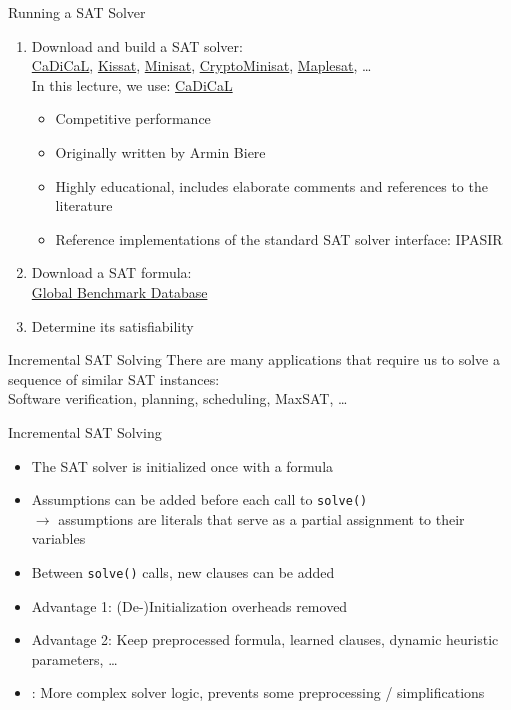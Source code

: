 \documentclass[t]{sdqbeamer}
\begin{document}
\begin{frame}{Running a SAT Solver}
\\[1em]
\begin{enumerate}\setlength{\itemsep}{1em}
	\item Download and build a SAT solver:\\[1ex]
	\href{https://github.com/arminbiere/cadical}{CaDiCaL}, \href{https://github.com/arminbiere/kissat}{Kissat}, \href{https://github.com/niklasso/minisat}{Minisat}, \href{https://github.com/msoos/cryptominisat}{CryptoMinisat}, \href{https://maplesat.github.io/}{Maplesat}, \dots\\[1ex]
	In this lecture, we use: \href{https://github.com/arminbiere/cadical}{CaDiCaL}\\[1ex]
	\begin{itemize}\setlength{\itemsep}{1ex}
		\item Competitive performance
		\item Originally written by Armin Biere
		\item Highly educational, includes elaborate comments and references to the literature
		\item Reference implementations of the standard SAT solver interface: IPASIR
	\end{itemize}
	\item Download a SAT formula:\\[1ex]
	\href{https://benchmark-database.de}{Global Benchmark Database}
	\item Determine its satisfiability
\end{enumerate}
\end{frame}

\begin{frame}{Incremental SAT Solving}
There are many applications that require us to solve a sequence of similar SAT instances:\\[1ex] 
Software verification, planning, scheduling, MaxSAT, \dots\\[1em]
\begin{block}{Incremental SAT Solving}
\begin{itemize}\setlength{\itemsep}{0.5em}
	\item The SAT solver is initialized once with a formula
	\item Assumptions can be added before each call to \texttt{solve()}\\[1ex]
	$\rightarrow$ assumptions are literals that serve as a partial assignment to their variables
	\item Between \texttt{solve()} calls, new clauses can be added
	\pause
	\item Advantage 1: (De-)Initialization overheads removed
	\item Advantage 2: Keep preprocessed formula, learned clauses, dynamic heuristic parameters, \ldots
	\pause
	\item {}: \pause More complex solver logic, prevents some preprocessing / simplifications
\end{itemize}
\end{block}
\end{frame}
\end{document}
